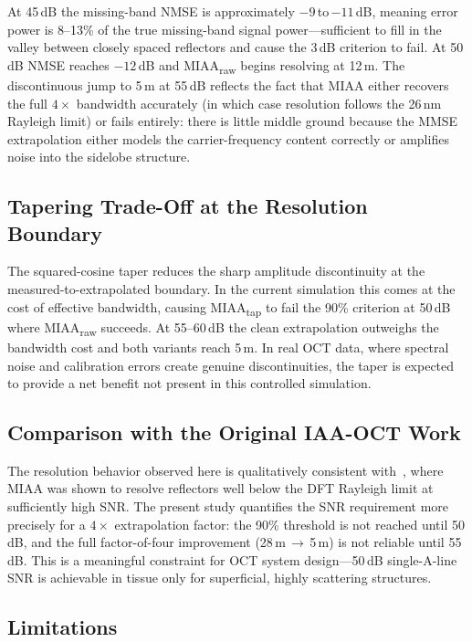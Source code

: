 \documentclass[conference]{IEEEtran}
\begin{document}
At 45\,dB the missing-band NMSE is approximately $-9$\,to\,$-11$\,dB,
meaning error power is 8--13\% of the true missing-band signal
power---sufficient to fill in the valley between closely spaced
reflectors and cause the 3\,dB criterion to fail. At 50\,dB NMSE
reaches $-12$\,dB and MIAA\textsubscript{raw} begins resolving at
12\,\textmu m. The discontinuous jump to 5\,\textmu m at 55\,dB
reflects the fact that MIAA either recovers the full $4\times$
bandwidth accurately (in which case resolution follows the 26\,nm
Rayleigh limit) or fails entirely: there is little middle ground
because the MMSE extrapolation either models the carrier-frequency
content correctly or amplifies noise into the sidelobe structure.

\subsection{Tapering Trade-Off at the Resolution Boundary}

The squared-cosine taper reduces the sharp amplitude discontinuity at
the measured-to-extrapolated boundary. In the current simulation this
comes at the cost of effective bandwidth, causing MIAA\textsubscript{tap}
to fail the 90\% criterion at 50\,dB where MIAA\textsubscript{raw}
succeeds. At 55--60\,dB the clean extrapolation outweighs the bandwidth
cost and both variants reach 5\,\textmu m. In real OCT data, where
spectral noise and calibration errors create genuine discontinuities,
the taper is expected to provide a net benefit not present in this
controlled simulation.

\subsection{Comparison with the Original IAA-OCT Work}

The resolution behavior observed here is qualitatively consistent
with~\cite{zhu2012iaa}, where MIAA was shown to resolve reflectors
well below the DFT Rayleigh limit at sufficiently high SNR. The present
study quantifies the SNR requirement more precisely for a $4\times$
extrapolation factor: the 90\% threshold is not reached until 50\,dB,
and the full factor-of-four improvement (28\,\textmu m\,$\to$\,5\,\textmu m)
is not reliable until 55\,dB. This is a meaningful constraint for OCT
system design---50\,dB single-A-line SNR is achievable in tissue only
for superficial, highly scattering structures.

\subsection{Limitations}
\end{document}
